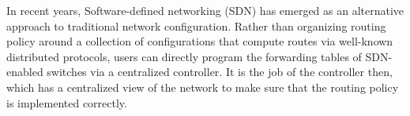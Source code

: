 \documentclass[sigchi]{acmart}
\begin{document}


%
%






In recent years, Software-defined networking (SDN) has emerged as an alternative 
approach to traditional network configuration. Rather than organizing routing policy
around a collection of configurations that compute routes via well-known distributed
protocols, users can directly program the forwarding tables of SDN-enabled switches via
a centralized controller. It is the job of the controller then, which has a centralized view
of the network to make sure that the routing policy is implemented correctly.
\end{document}
